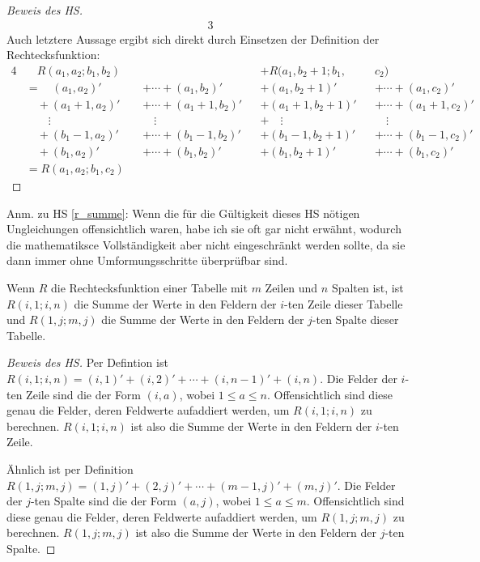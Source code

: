 \begin{proof}[Beweis des HS]
\begin{alignat*}{3}
    \end{alignat*}
    Auch letztere Aussage ergibt sich direkt durch Einsetzen der Definition der Rechtecksfunktion:
    \begin{alignat*}{4}
        &\quad R(a_1, a_2; b_1, b_2)&& &&+R(a_1, b_2+1; b_1, &&c_2)\\
        &=\quad(a_1, a_2)' &&+\cdots+ (a_1, b_2)'
        &&+(a_1, b_2+1)'&&+\cdots+(a_1, c_2)'\\
        &\quad+(a_1+1, a_2)'&&+\cdots+ (a_1+1, b_2)'
        &&+(a_1+1, b_2+1)'&&+\cdots+(a_1+1, c_2)'\\
        &\quad\quad\vdots&&\quad\vdots&&+\quad\vdots&&\quad\vdots\\
        &\quad+(b_1-1, a_2)'&&+\cdots + (b_1-1, b_2)'
        &&+(b_1-1, b_2+1)'&&+\cdots+(b_1-1, c_2)'\\
        &\quad+(b_1, a_2)'&&+ \cdots + (b_1, b_2)'
        &&+(b_1, b_2+1)'&&+\cdots+(b_1, c_2)'\\
        &=R(a_1, a_2; b_1, c_2)
    \end{alignat*}
\end{proof}
Anm.  zu HS \ref{r_summe}: Wenn die für die Gültigkeit dieses HS nötigen Ungleichungen offensichtlich waren, habe 
ich sie oft gar nicht erwähnt, wodurch die mathematiksce Vollständigkeit aber nicht eingeschränkt werden sollte, 
da sie dann immer ohne Umformungsschritte überprüfbar sind.
\begin{lem}\label{r_zeile_spalte}
    Wenn $R$ die Rechtecksfunktion einer Tabelle mit $m$ Zeilen und $n$ Spalten ist, ist $R(i, 1; i, n)$ die Summe 
    der Werte in den Feldern der $i$-ten Zeile dieser Tabelle und $R(1, j; m, j)$ die Summe der Werte in den Feldern 
    der $j$-ten Spalte dieser Tabelle.
\end{lem}
\begin{proof}[Beweis des HS]
    Per Defintion ist $R(i, 1; i, n)=(i, 1)'+(i, 2)'+\cdots+(i, n-1)'+(i, n)$. Die Felder der $i$-ten Zeile sind die 
    der Form $(i, a)$, wobei $1\leq a\leq n$. Offensichtlich sind diese genau die Felder, deren Feldwerte aufaddiert 
    werden, um $R(i, 1; i, n)$ zu berechnen. $R(i, 1; i, n)$ ist also die Summe der Werte in den Feldern der $i$-ten 
    Zeile.

    Ähnlich ist per Definition $R(1, j; m, j)=(1, j)'+(2, j)'+\cdots+(m-1, j)'+(m, j)'$. Die Felder der $j$-ten Spalte 
    sind die der Form $(a, j)$, wobei $1\leq a\leq m$. Offensichtlich sind diese genau die Felder, deren Feldwerte 
    aufaddiert werden, um $R(1, j; m, j)$ zu berechnen. $R(1, j; m, j)$ ist also die Summe der Werte in den Feldern 
    der $j$-ten Spalte.
\end{proof}
